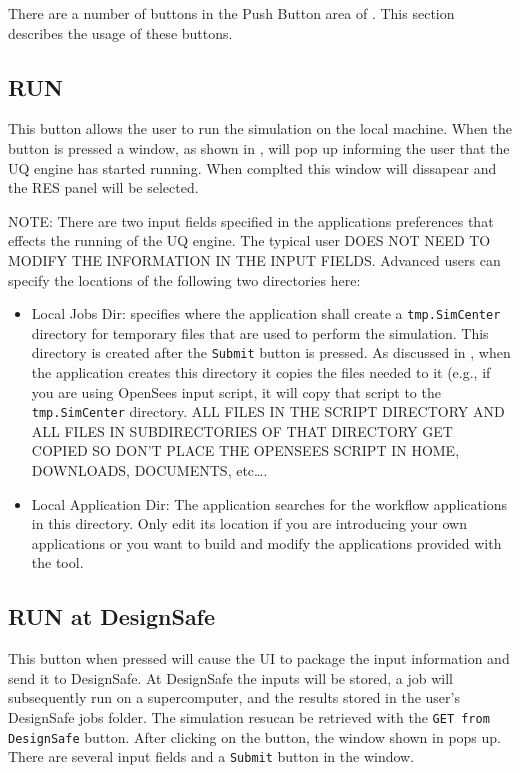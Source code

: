 There are a number of buttons in the Push Button area of . This section describes the usage of these buttons.

\subsection{RUN}

This button allows the user to run the simulation on the local machine. When the button is 
pressed a window, as shown in , will pop up informing the user 
that the UQ engine has started running. When complted this window will dissapear and the RES
panel will be selected.

NOTE: There are two input fields specified in the applications preferences that effects the running of the UQ engine. The typical user DOES NOT NEED TO MODIFY THE INFORMATION IN THE INPUT FIELDS. Advanced users can specify the locations of the following two directories here:

\begin{itemize}
\item Local Jobs Dir: specifies where the \texttt{\getsoftwarename{}} application shall
create a \texttt{tmp.SimCenter} directory for temporary files that are used to perform the simulation. This directory is created after the \texttt{Submit} button is pressed. As discussed in , when
the application creates this directory it copies the files needed to it (e.g., if you are using OpenSees input script, it
will copy that script to the \texttt{tmp.SimCenter} directory. ALL FILES IN
THE SCRIPT DIRECTORY AND ALL FILES IN SUBDIRECTORIES OF THAT DIRECTORY GET
COPIED SO DON’T PLACE THE OPENSEES SCRIPT IN HOME, DOWNLOADS, DOCUMENTS, etc….
\item Local Application Dir: The \texttt{\getsoftwarename{}} application searches for the workflow applications in this directory. Only edit its location if you are introducing your own applications or you want to build and modify the 
applications provided with the tool. 
\end{itemize}

\subsection{RUN at DesignSafe}
This button when pressed will cause the UI to package the input information and send it to 
DesignSafe. At DesignSafe the inputs will be stored, a job will subsequently run on a 
supercomputer, and the results stored in the user's DesignSafe jobs folder. The simulation 
resucan be retrieved with the \texttt{GET from DesignSafe} button. After clicking on the 
button, the window shown in  pops up. There are several input fields 
and a \texttt{Submit} button in the window. 

